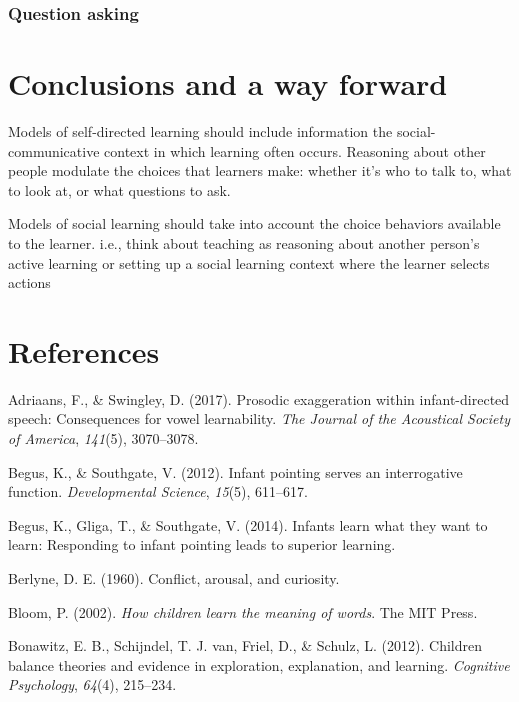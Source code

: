 \documentclass[a4paper,man,apacite,floatsintext]{apa6}
\begin{document}
\subsubsection{Question asking}\label{question-asking}

\section{Conclusions and a way
forward}\label{conclusions-and-a-way-forward}

Models of self-directed learning should include information the
social-communicative context in which learning often occurs. Reasoning
about other people modulate the choices that learners make: whether it's
who to talk to, what to look at, or what questions to ask.

Models of social learning should take into account the choice behaviors
available to the learner. i.e., think about teaching as reasoning about
another person's active learning or setting up a social learning context
where the learner selects actions

\newpage

\section{References}\label{references}

\setlength{\parindent}{-0.4in} \setlength{\leftskip}{0.125in} \noindent

\hypertarget{refs}{}
\hypertarget{ref-adriaans2017prosodic}{}
Adriaans, F., \& Swingley, D. (2017). Prosodic exaggeration within
infant-directed speech: Consequences for vowel learnability. \emph{The
Journal of the Acoustical Society of America}, \emph{141}(5),
3070--3078.

\hypertarget{ref-begus2012infant}{}
Begus, K., \& Southgate, V. (2012). Infant pointing serves an
interrogative function. \emph{Developmental Science}, \emph{15}(5),
611--617.

\hypertarget{ref-begus2014infants}{}
Begus, K., Gliga, T., \& Southgate, V. (2014). Infants learn what they
want to learn: Responding to infant pointing leads to superior learning.

\hypertarget{ref-berlyne1960conflict}{}
Berlyne, D. E. (1960). Conflict, arousal, and curiosity.

\hypertarget{ref-bloom2002children}{}
Bloom, P. (2002). \emph{How children learn the meaning of words}. The
MIT Press.

\hypertarget{ref-bonawitz2012children}{}
Bonawitz, E. B., Schijndel, T. J. van, Friel, D., \& Schulz, L. (2012).
Children balance theories and evidence in exploration, explanation, and
learning. \emph{Cognitive Psychology}, \emph{64}(4), 215--234.
\end{document}
